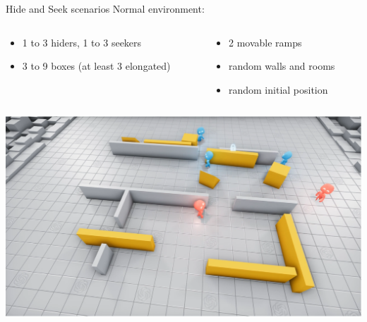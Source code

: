 \documentclass{beamer}
\begin{document}
\begin{frame}{Hide and Seek scenarios}
Normal environment:

\begin{columns}
\begin{column}{0.5\textwidth}
\begin{itemize}
    \item 1 to 3 hiders, 1 to 3 seekers
    \item 3 to 9 boxes (at least 3 elongated)
    \end{itemize}{}
\end{column}
\begin{column}{0.5\textwidth}  %
    \begin{itemize}
    \item 2 movable ramps
    \item random walls and rooms
    \item random initial position
    \end{itemize}{}
\end{column}
\end{columns}
\begin{center}
    \includegraphics[scale=0.25]{normalEnv.png}
\end{center}{}
\end{frame}
\end{document}
